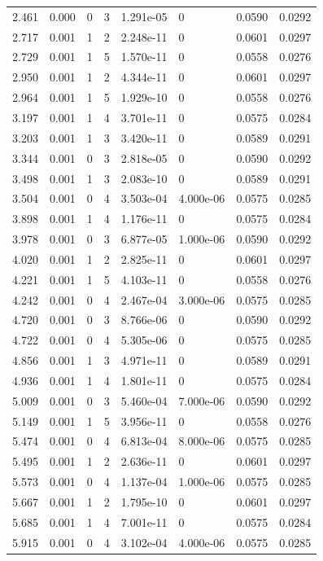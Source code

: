 \documentclass[preview]{standalone}
\begin{document}
{{\begin{tabular}{L{1.2cm}C{1.2cm} C{0.3cm}C{0.5cm} C{1.4cm}C{1.4cm} C{1.4cm}C{1.4cm}}
  2.461  &  0.000  & 0     &  3 &  1.291e-05  & 0  & 0.0590 &  0.0292   \\ 
  2.717  &  0.001  & 1     &  2 &  2.248e-11  & 0  & 0.0601 &  0.0297   \\ 
  2.729  &  0.001  & 1     &  5 &  1.570e-11  & 0  & 0.0558 &  0.0276   \\ 
  2.950  &  0.001  & 1     &  2 &  4.344e-11  & 0  & 0.0601 &  0.0297   \\ 
  2.964  &  0.001  & 1     &  5 &  1.929e-10  & 0  & 0.0558 &  0.0276   \\ 
  3.197  &  0.001  & 1     &  4 &  3.701e-11  & 0  & 0.0575 &  0.0284   \\ 
  3.203  &  0.001  & 1     &  3 &  3.420e-11  & 0  & 0.0589 &  0.0291   \\ 
  3.344  &  0.001  & 0     &  3 &  2.818e-05  & 0  & 0.0590 &  0.0292   \\ 
  3.498  &  0.001  & 1     &  3 &  2.083e-10  & 0  & 0.0589 &  0.0291   \\ 
  3.504  &  0.001  & 0     &  4 &  3.503e-04  & 4.000e-06  & 0.0575 &  0.0285   \\ 
  3.898  &  0.001  & 1     &  4 &  1.176e-11  & 0  & 0.0575 &  0.0284   \\ 
  3.978  &  0.001  & 0     &  3 &  6.877e-05  & 1.000e-06  & 0.0590 &  0.0292   \\ 
  4.020  &  0.001  & 1     &  2 &  2.825e-11  & 0  & 0.0601 &  0.0297   \\ 
  4.221  &  0.001  & 1     &  5 &  4.103e-11  & 0  & 0.0558 &  0.0276   \\ 
  4.242  &  0.001  & 0     &  4 &  2.467e-04  & 3.000e-06  & 0.0575 &  0.0285   \\ 
  4.720  &  0.001  & 0     &  3 &  8.766e-06  & 0  & 0.0590 &  0.0292   \\ 
  4.722  &  0.001  & 0     &  4 &  5.305e-06  & 0  & 0.0575 &  0.0285   \\ 
  4.856  &  0.001  & 1     &  3 &  4.971e-11  & 0  & 0.0589 &  0.0291   \\ 
  4.936  &  0.001  & 1     &  4 &  1.801e-11  & 0  & 0.0575 &  0.0284   \\ 
  5.009  &  0.001  & 0     &  3 &  5.460e-04  & 7.000e-06  & 0.0590 &  0.0292   \\ 
  5.149  &  0.001  & 1     &  5 &  3.956e-11  & 0  & 0.0558 &  0.0276   \\ 
  5.474  &  0.001  & 0     &  4 &  6.813e-04  & 8.000e-06  & 0.0575 &  0.0285   \\ 
  5.495  &  0.001  & 1     &  2 &  2.636e-11  & 0  & 0.0601 &  0.0297   \\ 
  5.573  &  0.001  & 0     &  4 &  1.137e-04  & 1.000e-06  & 0.0575 &  0.0285   \\ 
  5.667  &  0.001  & 1     &  2 &  1.795e-10  & 0  & 0.0601 &  0.0297   \\ 
  5.685  &  0.001  & 1     &  4 &  7.001e-11  & 0  & 0.0575 &  0.0284   \\ 
  5.915  &  0.001  & 0     &  4 &  3.102e-04  & 4.000e-06  & 0.0575 &  0.0285   \\ 
\hline 
\end{tabular} 

}}
\end{document}
